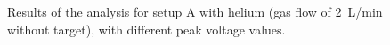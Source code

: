 \begin{figure}
{ }
 \hfill
 \caption{Results of the analysis for setup A with helium (gas flow of \SI{2}{\liter/\minute} without target), with different peak voltage values.}
 \label{fig:elio_d}
\end{figure}

